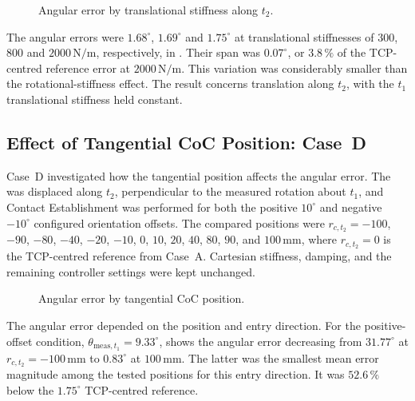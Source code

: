 \begin{figure}[H]
\centering

\caption{Angular error by translational stiffness along \(t_2\).}
\label{fig:results_case_c}
\end{figure}

The angular errors were \mbox{\(1.68^\circ\)}, \mbox{\(1.69^\circ\)}
and \mbox{\(1.75^\circ\)} at translational stiffnesses of
\mbox{\(300\)}, \mbox{\(800\)} and \mbox{\(2000\,\mathrm{N/m}\)}, respectively,
in \mbox{}.
Their span was \mbox{\(0.07^\circ\)}, or \mbox{\(3.8\,\%\)} of the
TCP-centred reference error at \mbox{\(2000\,\mathrm{N/m}\)}.
This variation was considerably smaller than the rotational-stiffness effect.
The result concerns translation along \mbox{\(t_2\)}, with the
\mbox{\(t_1\)} translational stiffness held constant.

\subsection{Effect of Tangential CoC Position: Case~D}
\label{sec:results_case_d}

Case~D investigated how the tangential  position affects the
angular error. The  was displaced along
\mbox{\(t_2\)}, perpendicular to the measured rotation about \mbox{\(t_1\)},
and Contact Establishment was performed for both the positive
\mbox{\(10^\circ\)} and negative \mbox{\(-10^\circ\)} configured orientation
offsets. The compared  positions were
\mbox{\(r_{c,t_2}=-100\)}, \mbox{\(-90\)}, \mbox{\(-80\)},
\mbox{\(-40\)}, \mbox{\(-20\)}, \mbox{\(-10\)}, \mbox{\(0\)},
\mbox{\(10\)}, \mbox{\(20\)}, \mbox{\(40\)}, \mbox{\(80\)},
\mbox{\(90\)}, and \mbox{\(100\,\mathrm{mm}\)}, where
\mbox{\(r_{c,t_2}=0\)} is the TCP-centred reference from Case~A. Cartesian
stiffness, damping, and the remaining controller settings were kept
unchanged.

\begin{figure}[H]
\centering

\caption{Angular error by tangential CoC position.}
\label{fig:results_case_d}
\end{figure}

The angular error depended on the  position and entry
direction. For the positive-offset condition,
\mbox{\(\theta_{\mathrm{meas},t_1}=9.33^\circ\)},
\mbox{} shows the angular error decreasing from
\mbox{\(31.77^\circ\)} at \mbox{\(r_{c,t_2}=-100\,\mathrm{mm}\)} to
\mbox{\(0.83^\circ\)} at \mbox{\(100\,\mathrm{mm}\)}.
The latter was the smallest mean error magnitude among the tested positions
for this entry direction. It was \mbox{\(52.6\,\%\)} below the
\mbox{\(1.75^\circ\)} TCP-centred reference.

